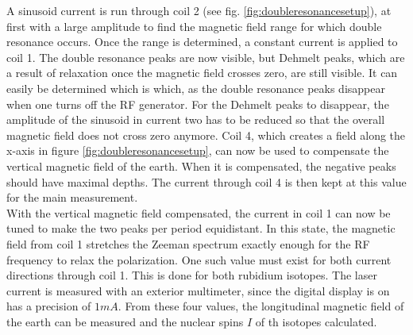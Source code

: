 A sinusoid current is run through coil 2 (see fig. \ref{fig:doubleresonancesetup}), at first with a large amplitude to find the magnetic field range for which double resonance occurs. Once the range is determined, a constant current is applied to coil 1. The double resonance peaks are now visible, but Dehmelt peaks, which are a result of relaxation once the magnetic field crosses zero, are still visible. It can easily be determined which is which, as the double resonance peaks disappear when one turns off the RF generator. For the Dehmelt peaks to disappear, the amplitude of the sinusoid in current two has to be reduced so that the overall magnetic field does not cross zero anymore.  Coil 4, which creates a field along the x-axis in figure \ref{fig:doubleresonancesetup}, can now be used to compensate the vertical magnetic field of the earth. When it is compensated, the negative peaks should have maximal depths. The current through coil 4 is then kept at this value for the main measurement.\\
With the vertical magnetic field compensated, the current in coil 1 can now be tuned to make the two peaks per period equidistant. In this state, the magnetic field from coil 1 stretches the Zeeman spectrum exactly enough for the RF frequency to relax the polarization. One such value must exist for both current directions through coil 1. This is done for both rubidium isotopes. The laser current is measured with an exterior multimeter, since the digital display is on has a precision of $\unit{1}{mA}$. From these four values, the longitudinal magnetic field of the earth can be measured and the nuclear spins $I$ of th isotopes calculated.

